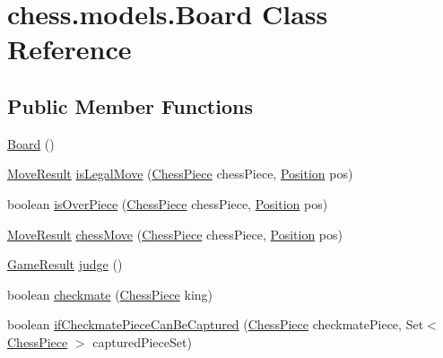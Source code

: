 \hypertarget{classchess_1_1models_1_1_board}{}\section{chess.\+models.\+Board Class Reference}
\label{classchess_1_1models_1_1_board}
\subsection*{Public Member Functions}
\begin{DoxyCompactItemize}
\item 
\mbox{\hyperlink{classchess_1_1models_1_1_board_a742cb1aaa3ec12625098a4ddf24fee19}{Board}} ()
\item 
\mbox{\hyperlink{enumchess_1_1models_1_1enums_1_1_move_result}{Move\+Result}} \mbox{\hyperlink{classchess_1_1models_1_1_board_a2514b6b830efc0aeeb2ba6f64aa033e2}{is\+Legal\+Move}} (\mbox{\hyperlink{classchess_1_1models_1_1_chess_piece}{Chess\+Piece}} chess\+Piece, \mbox{\hyperlink{classchess_1_1models_1_1_position}{Position}} pos)
\item 
boolean \mbox{\hyperlink{classchess_1_1models_1_1_board_a8ffee6403d98b5e5e68c0a2b73440100}{is\+Over\+Piece}} (\mbox{\hyperlink{classchess_1_1models_1_1_chess_piece}{Chess\+Piece}} chess\+Piece, \mbox{\hyperlink{classchess_1_1models_1_1_position}{Position}} pos)
\item 
\mbox{\hyperlink{enumchess_1_1models_1_1enums_1_1_move_result}{Move\+Result}} \mbox{\hyperlink{classchess_1_1models_1_1_board_a013a001cb8edfdd61272275d210609fd}{chess\+Move}} (\mbox{\hyperlink{classchess_1_1models_1_1_chess_piece}{Chess\+Piece}} chess\+Piece, \mbox{\hyperlink{classchess_1_1models_1_1_position}{Position}} pos)
\item 
\mbox{\hyperlink{enumchess_1_1models_1_1enums_1_1_game_result}{Game\+Result}} \mbox{\hyperlink{classchess_1_1models_1_1_board_a7e3f69e82d8337f3cf6109913e5335d3}{judge}} ()
\item 
boolean \mbox{\hyperlink{classchess_1_1models_1_1_board_a7268e3609f458bc8acd92b43727ca63d}{checkmate}} (\mbox{\hyperlink{classchess_1_1models_1_1_chess_piece}{Chess\+Piece}} king)
\item 
boolean \mbox{\hyperlink{classchess_1_1models_1_1_board_a235a8cac7cd2b48fb81165fbedb386e8}{if\+Checkmate\+Piece\+Can\+Be\+Captured}} (\mbox{\hyperlink{classchess_1_1models_1_1_chess_piece}{Chess\+Piece}} checkmate\+Piece, Set$<$ \mbox{\hyperlink{classchess_1_1models_1_1_chess_piece}{Chess\+Piece}} $>$ captured\+Piece\+Set)

\end{DoxyCompactItemize}
